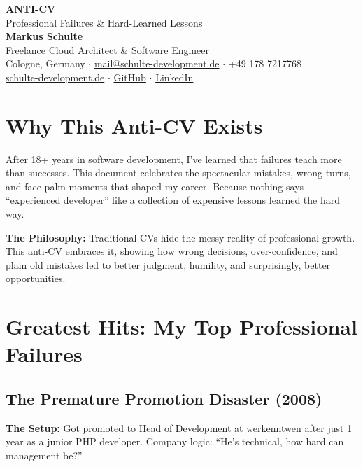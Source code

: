 \documentclass[11pt,a4paper]{article}
\begin{document}
\begin{center}
{\Huge\bfseries\sffamily\color{darkblue} ANTI-CV}\\[0.3em]
{\Large\sffamily Professional Failures \& Hard-Learned Lessons}\\[0.5em]
{\large\bfseries Markus Schulte}\\[0.2em]
{\normalsize Freelance Cloud Architect \& Software Engineer}\\[0.2em]
{\small Cologne, Germany $\cdot$ \href{mailto:mail@schulte-development.de}{mail@schulte-development.de} $\cdot$ +49 178 7217768}\\[0.2em]
{\small \href{https://schulte-development.de}{schulte-development.de} $\cdot$ \href{https://github.com/SchulteDev}{GitHub} $\cdot$ \href{https://linkedin.com/in/markus-schulte}{LinkedIn}}
\end{center}

\vspace{0.5em}

\section{Why This Anti-CV Exists}

After 18+ years in software development, I've learned that failures teach more than successes. This document celebrates the spectacular mistakes, wrong turns, and face-palm moments that shaped my career. Because nothing says ``experienced developer'' like a collection of expensive lessons learned the hard way.

\textbf{The Philosophy:} Traditional CVs hide the messy reality of professional growth. This anti-CV embraces it, showing how wrong decisions, over-confidence, and plain old mistakes led to better judgment, humility, and surprisingly, better opportunities.

\section{Greatest Hits: My Top Professional Failures}

\subsection{The Premature Promotion Disaster (2008)}
\textbf{The Setup:} Got promoted to Head of Development at werkenntwen after just 1 year as a junior PHP developer. Company logic: ``He's technical, how hard can management be?''
\end{document}
